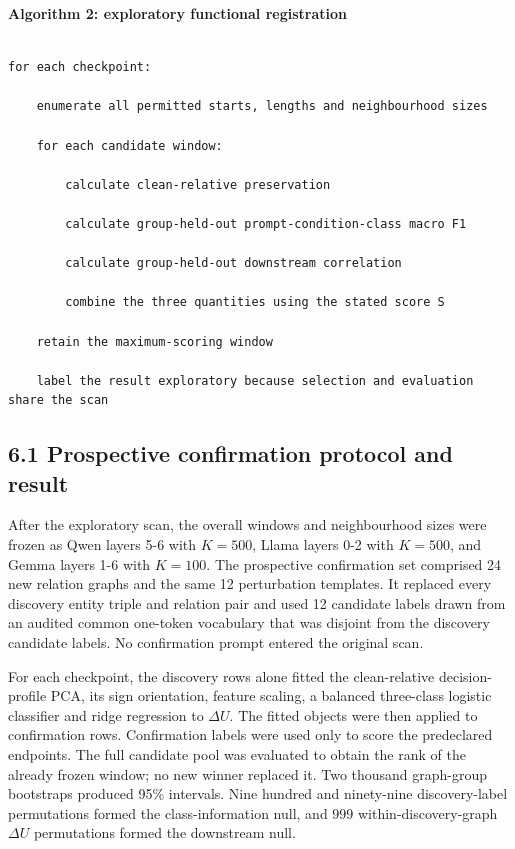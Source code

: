 \documentclass[10pt]{article}
\begin{document}
\textbf{Algorithm 2: exploratory functional registration}

\begin{Verbatim}[fontsize=\small,breaklines=true,breakanywhere=true]

for each checkpoint:

    enumerate all permitted starts, lengths and neighbourhood sizes

    for each candidate window:

        calculate clean-relative preservation

        calculate group-held-out prompt-condition-class macro F1

        calculate group-held-out downstream correlation

        combine the three quantities using the stated score S

    retain the maximum-scoring window

    label the result exploratory because selection and evaluation share the scan

\end{Verbatim}

\subsection*{6.1 Prospective confirmation protocol and result}

After the exploratory scan, the overall windows and neighbourhood sizes were frozen as Qwen layers 5-6 with \(K=500\), Llama layers 0-2 with \(K=500\), and Gemma layers 1-6 with \(K=100\). The prospective confirmation set comprised 24 new relation graphs and the same 12 perturbation templates. It replaced every discovery entity triple and relation pair and used 12 candidate labels drawn from an audited common one-token vocabulary that was disjoint from the discovery candidate labels. No confirmation prompt entered the original scan.

For each checkpoint, the discovery rows alone fitted the clean-relative decision-profile PCA, its sign orientation, feature scaling, a balanced three-class logistic classifier and ridge regression to \(\Delta U\). The fitted objects were then applied to confirmation rows. Confirmation labels were used only to score the predeclared endpoints. The full candidate pool was evaluated to obtain the rank of the already frozen window; no new winner replaced it. Two thousand graph-group bootstraps produced 95\% intervals. Nine hundred and ninety-nine discovery-label permutations formed the class-information null, and 999 within-discovery-graph \(\Delta U\) permutations formed the downstream null.
\end{document}
